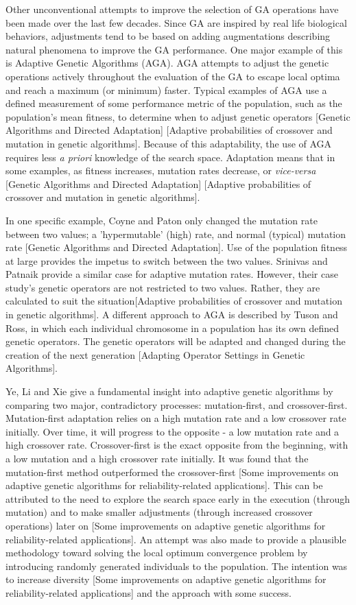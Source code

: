 \documentclass{sig-alternate}
\begin{document}
Other unconventional attempts to improve the selection of GA operations have been made over the last few decades. Since GA are inspired by real life biological behaviors, adjustments tend to be based on adding augmentations describing natural phenomena to improve the GA performance. One major example of this is Adaptive Genetic Algorithms (AGA). AGA attempts to adjust the genetic operations actively throughout the evaluation of the GA to escape local optima and reach a maximum (or minimum) faster. Typical examples of AGA use a defined measurement of some performance metric of the population, such as the population's mean fitness, to determine when to adjust genetic operators [Genetic Algorithms and Directed Adaptation] [Adaptive probabilities of crossover and mutation in genetic algorithms]. Because of this adaptability, the use of AGA requires less \emph{a priori} knowledge of the search space. Adaptation means that in some examples, as fitness increases, mutation rates decrease, or \textit{vice-versa} [Genetic Algorithms and Directed Adaptation] [Adaptive probabilities of crossover and mutation in genetic algorithms]. 

In one specific example, Coyne and Paton only changed the mutation rate between two values; a 'hypermutable' (high) rate, and normal (typical) mutation rate [Genetic Algorithms and Directed Adaptation]. Use of the population fitness at large provides the impetus to switch between the two values. Srinivas and Patnaik provide a similar case for adaptive mutation rates. However, their case study's genetic operators are not restricted to two values. Rather, they are calculated to suit the situation[Adaptive probabilities of crossover and mutation in genetic algorithms]. A different approach to AGA is described by Tuson and Ross, in which each individual chromosome in a population has its own defined genetic operators. The genetic operators will be adapted and changed during the creation of the next generation [Adapting Operator Settings in Genetic Algorithms]. 

Ye, Li and Xie give a fundamental insight into adaptive genetic algorithms by comparing two major, contradictory processes: mutation-first, and crossover-first. Mutation-first adaptation relies on a high mutation rate and a low crossover rate initially. Over time, it will progress to the opposite - a low mutation rate and a high crossover rate. Crossover-first is the exact opposite from the beginning, with a low mutation and a high crossover rate initially. It was found that the mutation-first method outperformed the crossover-first [Some improvements on adaptive genetic algorithms for reliability-related applications]. This can be attributed to the need to explore the search space early in the execution (through mutation) and to make smaller adjustments (through increased crossover operations) later on [Some improvements on adaptive genetic algorithms for reliability-related applications]. An attempt was also made to provide a plausible methodology toward solving the local optimum convergence problem by introducing randomly generated individuals to the population. The intention was to increase diversity [Some improvements on adaptive genetic algorithms for reliability-related applications] and the approach with some success. 
\end{document}
